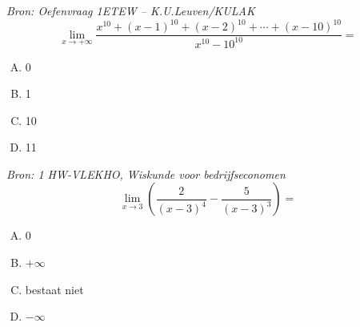 \documentclass[12pt]{article}
\begin{document}
\begin{oefening}{\em\small Bron: Oefenvraag 1ETEW -- K.U.Leuven/KULAK}\\
$$\lim_{x\to+\infty}\dfrac{x^{10}+(x-1)^{10}+(x-2)^{10}+\cdots+(x-10)^{10}}{x^{10}-10^{10}}=$$
  \begin{enumerate}[(A)]
  \itemsep1em
  \item 0
  \item 1
  \item 10
  \item 11
  \end{enumerate}
\end{oefening}

\begin{oefening}{\em\small Bron: 1 HW-VLEKHO, Wiskunde voor bedrijfseconomen}\\
$$\lim_{x\to3}\left(\dfrac{2}{\left(x-3\right)^4}-\dfrac{5}{\left(x-3\right)^3}\right)=$$
  \begin{enumerate}[(A)]
  \itemsep1em
  \item 0
  \item $+\infty$
  \item bestaat niet
  \item $-\infty$
  \end{enumerate}
\end{oefening}


\end{document}
